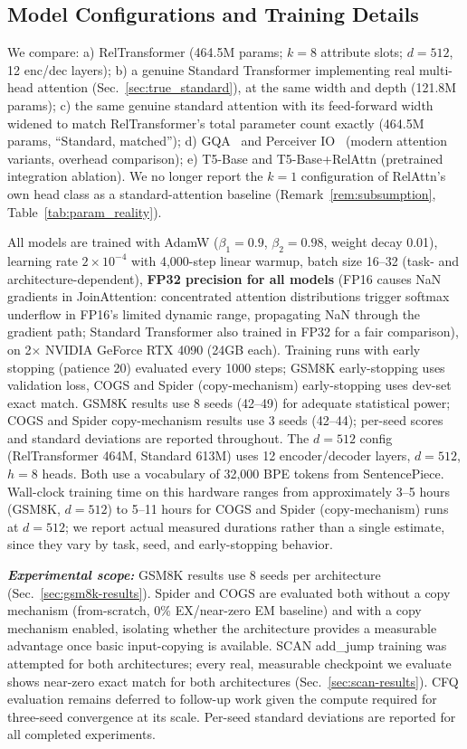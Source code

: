 \documentclass[review]{elsarticle}
\begin{document}
\subsection{Model Configurations and Training Details}

We compare: a) {RelTransformer} (464.5M params; $k{=}8$ attribute slots; $d{=}512$, 12 enc/dec layers); b) a genuine {Standard Transformer} implementing real multi-head attention (Sec.~\ref{sec:true_standard}), at the same width and depth (121.8M params); c) the same genuine standard attention with its feed-forward width widened to match RelTransformer's total parameter count exactly (464.5M params, ``Standard, matched''); d) {GQA}~\cite{ainslie2023gqa} and {Perceiver IO}~\cite{jaegle2022perceiver} (modern attention variants, overhead comparison); e) {T5-Base} and {T5-Base+RelAttn} (pretrained integration ablation). We no longer report the $k{=}1$ configuration of RelAttn's own head class as a standard-attention baseline (Remark~\ref{rem:subsumption}, Table~\ref{tab:param_reality}).

All models are trained with AdamW ($\beta_1{=}0.9$, $\beta_2{=}0.98$, weight decay 0.01), learning rate $2{\times}10^{-4}$ with 4,000-step linear warmup, batch size 16--32 (task- and architecture-dependent), \textbf{FP32 precision for all models} (FP16 causes NaN gradients in JoinAttention: concentrated attention distributions trigger softmax underflow in FP16's limited dynamic range, propagating NaN through the gradient path; Standard Transformer also trained in FP32 for a fair comparison), on 2$\times$ NVIDIA GeForce RTX 4090 (24GB each). Training runs with early stopping (patience 20) evaluated every 1000 steps; GSM8K early-stopping uses validation loss, COGS and Spider (copy-mechanism) early-stopping uses dev-set exact match. GSM8K results use 8 seeds (42--49) for adequate statistical power; COGS and Spider copy-mechanism results use 3 seeds (42--44); per-seed scores and standard deviations are reported throughout. The $d{=}512$ config (RelTransformer 464M, Standard 613M) uses 12 encoder/decoder layers, $d{=}512$, $h{=}8$ heads. Both use a vocabulary of 32,000 BPE tokens from SentencePiece. Wall-clock training time on this hardware ranges from approximately 3--5 hours (GSM8K, $d{=}512$) to 5--11 hours for COGS and Spider (copy-mechanism) runs at $d{=}512$; we report actual measured durations rather than a single estimate, since they vary by task, seed, and early-stopping behavior.

\textit{\textbf{Experimental scope:}} GSM8K results use 8 seeds per architecture (Sec.~\ref{sec:gsm8k-results}). Spider and COGS are evaluated both without a copy mechanism (from-scratch, 0\% EX/near-zero EM baseline) and with a copy mechanism enabled, isolating whether the architecture provides a measurable advantage once basic input-copying is available. SCAN add\_jump training was attempted for both architectures; every real, measurable checkpoint we evaluate shows near-zero exact match for both architectures (Sec.~\ref{sec:scan-results}). CFQ evaluation remains deferred to follow-up work given the compute required for three-seed convergence at its scale. Per-seed standard deviations are reported for all completed experiments.
\end{document}
